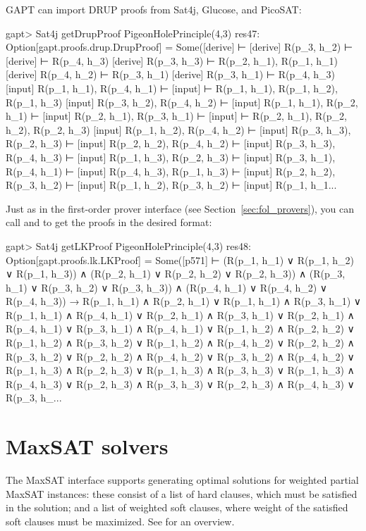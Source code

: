 \documentclass[a4paper,11pt]{book}
\newcommand{\cli}[1]{{\ttfamily {#1}}}
\begin{document}
GAPT can import DRUP proofs from Sat4j, Glucose, and PicoSAT:
\begin{clilisting}
gapt> Sat4j getDrupProof PigeonHolePrinciple(4,3)
res47: Option[gapt.proofs.drup.DrupProof] =
Some([derive]  ⊢
[derive] R(p_3, h_2) ⊢
[derive]  ⊢ R(p_4, h_3)
[derive] R(p_3, h_3) ⊢ R(p_2, h_1), R(p_1, h_1)
[derive] R(p_4, h_2) ⊢ R(p_3, h_1)
[derive] R(p_3, h_1) ⊢ R(p_4, h_3)
[input] R(p_1, h_1), R(p_4, h_1) ⊢
[input]  ⊢ R(p_1, h_1), R(p_1, h_2), R(p_1, h_3)
[input] R(p_3, h_2), R(p_4, h_2) ⊢
[input] R(p_1, h_1), R(p_2, h_1) ⊢
[input] R(p_2, h_1), R(p_3, h_1) ⊢
[input]  ⊢ R(p_2, h_1), R(p_2, h_2), R(p_2, h_3)
[input] R(p_1, h_2), R(p_4, h_2) ⊢
[input] R(p_3, h_3), R(p_2, h_3) ⊢
[input] R(p_2, h_2), R(p_4, h_2) ⊢
[input] R(p_3, h_3), R(p_4, h_3) ⊢
[input] R(p_1, h_3), R(p_2, h_3) ⊢
[input] R(p_3, h_1), R(p_4, h_1) ⊢
[input] R(p_4, h_3), R(p_1, h_3) ⊢
[input] R(p_2, h_2), R(p_3, h_2) ⊢
[input] R(p_1, h_2), R(p_3, h_2) ⊢
[input] R(p_1, h_1...

\end{clilisting}

Just as in the first-order prover interface (see Section~\ref{sec:fol_provers}), you can call
\cli{getResolutionProof} and \cli{getLKProof} to get the proofs in the desired
format:
\begin{clilisting}
gapt> Sat4j getLKProof PigeonHolePrinciple(4,3)
res48: Option[gapt.proofs.lk.LKProof] =
Some([p571]
⊢
(R(p_1, h_1) ∨ R(p_1, h_2) ∨ R(p_1, h_3)) ∧
    (R(p_2, h_1) ∨ R(p_2, h_2) ∨ R(p_2, h_3)) ∧
    (R(p_3, h_1) ∨ R(p_3, h_2) ∨ R(p_3, h_3)) ∧
    (R(p_4, h_1) ∨ R(p_4, h_2) ∨ R(p_4, h_3)) →
  R(p_1, h_1) ∧ R(p_2, h_1) ∨
    R(p_1, h_1) ∧ R(p_3, h_1) ∨
    R(p_1, h_1) ∧ R(p_4, h_1) ∨
    R(p_2, h_1) ∧ R(p_3, h_1) ∨
    R(p_2, h_1) ∧ R(p_4, h_1) ∨
    R(p_3, h_1) ∧ R(p_4, h_1) ∨
    R(p_1, h_2) ∧ R(p_2, h_2) ∨
    R(p_1, h_2) ∧ R(p_3, h_2) ∨
    R(p_1, h_2) ∧ R(p_4, h_2) ∨
    R(p_2, h_2) ∧ R(p_3, h_2) ∨
    R(p_2, h_2) ∧ R(p_4, h_2) ∨
    R(p_3, h_2) ∧ R(p_4, h_2) ∨
    R(p_1, h_3) ∧ R(p_2, h_3) ∨
    R(p_1, h_3) ∧ R(p_3, h_3) ∨
    R(p_1, h_3) ∧ R(p_4, h_3) ∨
    R(p_2, h_3) ∧ R(p_3, h_3) ∨
    R(p_2, h_3) ∧ R(p_4, h_3) ∨
    R(p_3, h_...

\end{clilisting}

\section{MaxSAT solvers}

The MaxSAT interface supports generating optimal solutions for weighted partial
MaxSAT instances: these consist of a list of hard clauses, which must be
satisfied in the solution; and a list of weighted soft clauses, where weight of
the satisfied soft clauses must be maximized.  See \cite{Argelich2008First}
for an overview.
\end{document}
